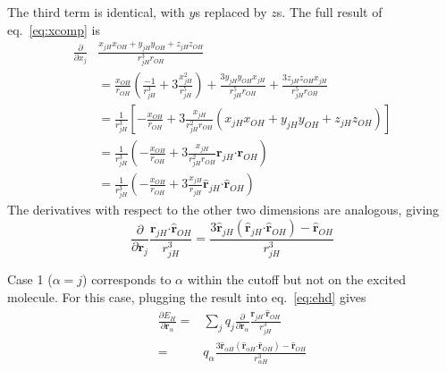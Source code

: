 \documentclass{article}
\newcommand{\vect}[1]{\boldsymbol{\mathbf{#1}}}
\begin{document}
The third term is identical, with $y$s replaced by $z$s.
The full result of eq.~\ref{eq:xcomp} is
\begin{align*}
\frac{\partial}{\partial x_j} &\frac{x_{jH}x_{OH}+y_{jH}y_{OH} + z_{jH}z_{OH}}{r_{jH}^3r_{OH}} \\
&=\frac{x_{OH}}{r_{OH}} \left( \frac{-1}{r_{jH}^3} + 3 \frac{x_{jH}^2}{r_{jH}^5} \right) + \frac{3y_{jH}y_{OH}x_{jH}}{r_{jH}^5r_{OH}} + \frac{3z_{jH}z_{OH}x_{jH}}{r_{jH}^5r_{OH}} \\
&= \frac{1}{r_{jH}^3} \left[ -\frac{x_{OH}}{r_{OH}} + 3\frac{x_{jH}}{r_{jH}^2r_{OH}}\left( x_{jH}x_{OH} + y_{jH}y_{OH} + z_{jH}z_{OH}\right) \right] \\
&= \frac{1}{r_{jH}^3} \left( -\frac{x_{OH}}{r_{OH}} + 3\frac{x_{jH}}{r_{jH}^2r_{OH}}\vect r_{jH}\vect\cdot\vect r_{OH} \right) \\
&= \frac{1}{r_{jH}^3} \left( -\frac{x_{OH}}{r_{OH}} + 3\frac{x_{jH}}{r_{jH}}\vect{\hat r}_{jH}\vect\cdot\vect{\hat r}_{OH} \right)
\end{align*}
The derivatives with respect to the other two dimensions are analogous, giving
\begin{equation}
\frac{\partial}{\partial \vect r_j} \frac{\vect{r}_{jH}\vect\cdot\vect{\hat r}_{OH} }{r_{jH}^3} = \frac{ 3\vect{\hat r}_{jH}(\vect{\hat r}_{jH}\vect\cdot\vect{\hat r}_{OH}) - \vect{\hat r}_{OH}}{r_{jH}^3}
\end{equation}

Case 1 ($\alpha=j$) corresponds to $\alpha$ within the cutoff but not on the excited molecule.
For this case, plugging the result into eq.~\ref{eq:ehd} gives
\begin{align}
\frac{\partial E_H}{\partial \vect r_\alpha} =& \sum_j q_j \frac{\partial}{\partial \vect r_\alpha} \frac{\vect{r}_{jH}\vect\cdot\vect{\hat r}_{OH} }{r_{jH}^3} \\
=& q_\alpha \frac{ 3\vect{\hat r}_{\alpha H}(\vect{\hat r}_{\alpha H}\vect\cdot\vect{\hat r}_{OH}) - \vect{\hat r}_{OH}}{r_{\alpha H}^3}
\end{align}
\end{document}
